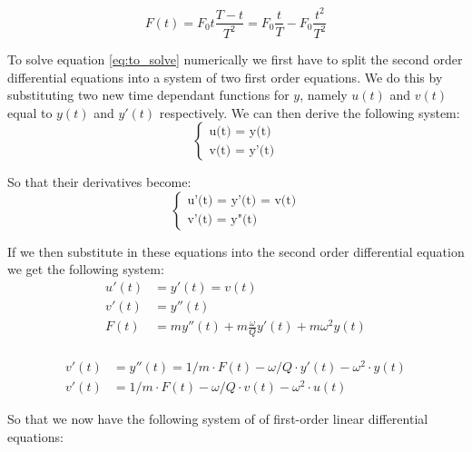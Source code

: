 \begin{equation}
    F(t) = F_0 t\frac{T-t}{T^2}= F_0 \frac{t}{T} - F_0 \frac{t^2}{T^2}
    \label{eq:force_q3}
\end{equation}

To solve equation \ref{eq:to_solve} numerically we first have to split the second order differential equations into a system of two first order equations. We do this by substituting two new time dependant functions for $y$, namely $u(t)$ and $v(t)$ equal to $y(t)$ and $y'(t)$ respectively. We can then derive the following system:\\

\begin{equation*}
    \left\{ \begin{matrix} \mbox{u(t) = y(t)}\\
    \mbox{v(t) = y'(t)} \end{matrix} \right.
\end{equation*}

So that their derivatives become:\\

\begin{equation*}
    \left\{ \begin{matrix} \mbox{u'(t) = y'(t) = v(t)}\\
    \mbox{v'(t) = y"(t)} \end{matrix} \right.
\end{equation*}

If we then substitute in these equations into the second order differential equation we get the following system:\\

\begin{align*}
    u'(t) &= y'(t) = v(t)\\
    v'(t) &= y''(t)\\
    F(t) &= m y''(t)+m\frac{\omega}{Q}y'(t)+m \omega^2 y(t)\\
\end{align*}

\begin{align*}
    v'(t) &= y''(t) = 1/m \cdot F(t) - \omega/Q\cdot y'(t)-\omega^2\cdot y(t)\\
    v'(t) &= 1/m\cdot F(t) - \omega/Q\cdot v(t)-\omega^2\cdot u(t)
\end{align*}

So that we now have the following system of of first-order linear differential equations:\\

